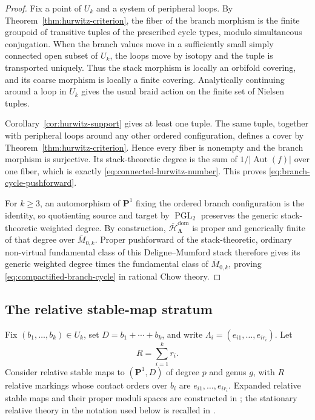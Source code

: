 \documentclass[11pt]{amsart}
\theoremstyle{plain}
\theoremstyle{definition}
\numberwithin{equation}{section}
\begin{document}
\begin{proof}
Fix a point of $U_k$ and a system of peripheral loops.  By
Theorem~\ref{thm:hurwitz-criterion}, the fiber of the branch morphism is the
finite groupoid of transitive tuples of the prescribed cycle types, modulo
simultaneous conjugation.  When the branch values move in a sufficiently
small simply connected open subset of $U_k$, the loops move by isotopy and
the tuple is transported uniquely.  Thus the stack morphism is locally an
orbifold covering, and its coarse morphism is locally a finite covering.
Analytically continuing around a loop in $U_k$ gives the usual braid action
on the finite set of Nielsen tuples.

Corollary~\ref{cor:hurwitz-support} gives at least one tuple.  The same tuple,
together with peripheral loops around any other ordered configuration,
defines a cover by Theorem~\ref{thm:hurwitz-criterion}.  Hence every fiber is
nonempty and the branch morphism is surjective.  Its stack-theoretic degree
is the sum of $1/|\operatorname{Aut}(f)|$ over one fiber, which is exactly
\eqref{eq:connected-hurwitz-number}.  This proves
\eqref{eq:branch-cycle-pushforward}.

For $k\geq3$, an automorphism of $\mathbf P^1$ fixing the ordered branch
configuration is the identity, so quotienting source and target by
$\operatorname{PGL}_2$ preserves the generic stack-theoretic weighted
degree.  By construction,
$\overline{\mathcal H}^{\mathrm{dom}}_{\boldsymbol\Lambda}$ is proper and
generically finite of that degree over $\overline M_{0,k}$.  Proper
pushforward of the stack-theoretic, ordinary non-virtual fundamental class of this
Deligne--Mumford stack therefore gives its generic weighted degree times
the fundamental class of $\overline M_{0,k}$, proving
\eqref{eq:compactified-branch-cycle} in rational Chow theory.
\end{proof}

\subsection{The relative stable-map stratum}

Fix $(b_1,\ldots,b_k)\in U_k$, set $D=b_1+\cdots+b_k$, and write
$\Lambda_i=(e_{i1},\ldots,e_{ir_i})$.  Let
\[
 R=\sum_{i=1}^k r_i.
\]
Consider relative stable maps to $(\mathbf P^1,D)$ of degree $p$ and genus
$g$, with $R$ relative markings whose contact orders over $b_i$ are
$e_{i1},\ldots,e_{ir_i}$.  Expanded relative stable maps and their proper
moduli spaces are constructed in \cite{JunLiStable}; the stationary relative
theory in the notation used below is recalled in
\cite[Section~1.2]{OkounkovPandharipande}.
\end{document}
